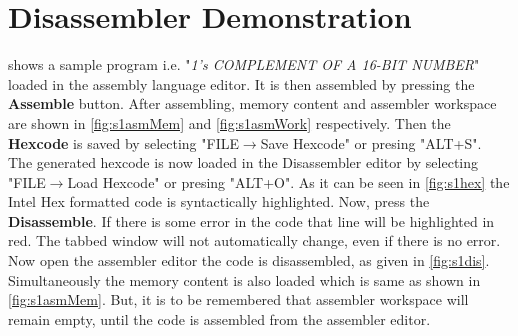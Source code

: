 \section{Disassembler Demonstration}
 shows a sample program i.e. "\textit{1's COMPLEMENT OF A 16-BIT NUMBER}" loaded in the assembly language editor. It is then assembled by pressing the \textbf{Assemble} button. After assembling, memory content  and assembler workspace are shown in \cref{fig:s1asmMem} and \cref{fig:s1asmWork} respectively. Then the \textbf{Hexcode} is saved by selecting "FILE$ \rightarrow $Save Hexcode" or presing "ALT+S". \\

The generated hexcode is now loaded in the Disassembler editor by selecting "FILE$ \rightarrow $Load Hexcode" or presing "ALT+O". As it can be seen in \cref{fig:s1hex} the Intel Hex formatted code is syntactically highlighted.
Now, press the \textbf{Disassemble}. If there is some error in the code that line will be highlighted in red.  The tabbed window will not automatically change, even if there is no error. Now open the assembler editor the code is disassembled, as given in \cref{fig:s1dis}. Simultaneously the memory content is also loaded which is same as shown in \cref{fig:s1asmMem}. But, it is to be remembered that assembler workspace will remain empty, until the code is assembled from the assembler editor.  

